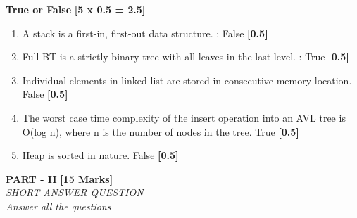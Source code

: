 \documentclass[12pt ,a4paper]{exam}
\begin{document}
  \noindent \textbf{True or False} \hfill\textbf{ [5 x 0.5 = 2.5]}
  
  \begin{enumerate}[start=16,label={\bfseries Q\arabic*)}]
  	\item A stack is a first-in, first-out data structure. : False  \hfill\textbf{ [0.5]}
  	\item Full BT is a strictly binary tree with all leaves in the last level. : True  \hfill\textbf{ [0.5]}
  	\item Individual elements in linked list are stored in consecutive memory location. False  \hfill\textbf{ [0.5]}
  	\item The worst case time complexity of the insert operation into an AVL tree is O(log n), where n is the number of nodes in the tree. True  \hfill\textbf{ [0.5]}
  	\item Heap is sorted in nature. False  \hfill\textbf{ [0.5]}
  \end{enumerate}
	
	\vspace{0.1mm}
	\pagebreak
	\begin{center}
		\textbf{PART - II} \textbf{[15 Marks]}\\
		\noindent \textit{SHORT ANSWER QUESTION} \\
		\noindent \textit{Answer all the questions} 
	\end{center}
\end{document}
